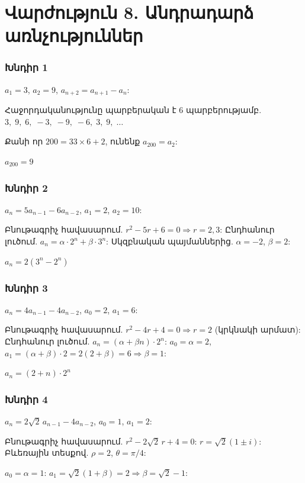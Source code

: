 
\section*{Վարժություն 8. Անդրադարձ առնչություններ}

\subsubsection*{Խնդիր 1}
$a_1=3$, $a_2=9$, $a_{n+2}=a_{n+1}-a_n$:

Հաջորդականությունը պարբերական է 6 պարբերությամբ.
$3,\;9,\;6,\;-3,\;-9,\;-6,\;3,\;9,\;\ldots$

Քանի որ $200 = 33\times 6 + 2$, ունենք $a_{200}=a_2$:

$\boxed{a_{200}=9}$

\subsubsection*{Խնդիր 2}
$a_n=5a_{n-1}-6a_{n-2}$, $a_1=2$, $a_2=10$:

Բնութագրիչ հավասարում. $r^2-5r+6=0 \Rightarrow r=2,3$:
Ընդհանուր լուծում. $a_n=\alpha\cdot 2^n+\beta\cdot 3^n$:
Սկզբնական պայմաններից. $\alpha=-2$, $\beta=2$:

$\boxed{a_n = 2(3^n - 2^n)}$

\subsubsection*{Խնդիր 3}
$a_n=4a_{n-1}-4a_{n-2}$, $a_0=2$, $a_1=6$:

Բնութագրիչ հավասարում. $r^2-4r+4=0\Rightarrow r=2$ (կրկնակի արմատ):
Ընդհանուր լուծում. $a_n=(\alpha+\beta n)\cdot 2^n$:
$a_0=\alpha=2$, $a_1=(\alpha+\beta)\cdot 2 = 2(2+\beta)=6 \Rightarrow \beta=1$:

$\boxed{a_n = (2+n)\cdot 2^n}$

\subsubsection*{Խնդիր 4}
$a_n = 2\sqrt{2}\,a_{n-1}-4a_{n-2}$, $a_0=1$, $a_1=2$:

Բնութագրիչ հավասարում. $r^2-2\sqrt{2}\,r+4=0$:
$r = \sqrt{2}(1\pm i)$: Բևեռային տեսքով. $\rho=2$, $\theta=\pi/4$:

$a_0 = \alpha = 1$: $a_1 = \sqrt{2}(1+\beta)=2 \Rightarrow \beta = \sqrt{2}-1$:

